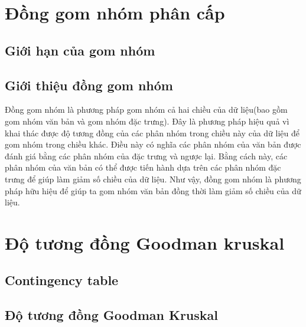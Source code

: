 \section{Đồng gom nhóm phân cấp}

	\subsection{Giới hạn của gom nhóm}
	
	\subsection{Giới thiệu đồng gom nhóm}
	Đồng gom nhóm là phương pháp gom nhóm cả hai chiều của dữ liệu(bao gồm gom nhóm văn bản và gom nhóm đặc trưng).
	Đây là phương pháp hiệu quả vì khai thác được độ tương đồng của các phân nhóm trong chiều này của dữ liệu để gom nhóm trong chiều khác.
	Điều này có nghĩa các phân nhóm của văn bản được đánh giá bằng các phân nhóm của đặc trưng và ngược lại.
	Bằng cách này, các phân nhóm của văn bản có thể được tiến hành dựa trên các phân nhóm đặc trưng để giúp làm giảm số chiều của dữ liệu.
	Như vậy, đồng gom nhóm là phương pháp hữu hiệu để giúp ta gom nhóm văn bản đồng thời làm giảm số chiều của dữ liệu.


\section{Độ tương đồng Goodman kruskal}

	\subsection{Contingency table}
	
	\subsection{Độ tương đồng Goodman Kruskal}

